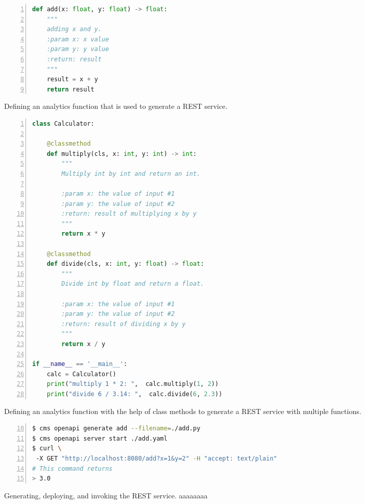 \newcommand{\FONT}{\tiny}


\begin{figure}[htb]
\begin{lstlisting}[language=Python,
                   basicstyle=\ttfamily\FONT,
                   numbers=left,                   
                   numbersep=5pt,
                   xleftmargin=5mm]
def add(x: float, y: float) -> float:
    """
    adding x and y.
    :param x: x value
    :param y: y value
    :return: result
    """
    result = x + y
    return result
\end{lstlisting}
\caption{Defining an analytics function that is used to generate a REST service.}
\label{fig:function}
\bigskip

\begin{lstlisting}[language=Python,
                   basicstyle=\ttfamily\FONT,
                   numbers=left,                   
                   numbersep=5pt,
                   xleftmargin=5mm]
class Calculator:

    @classmethod
    def multiply(cls, x: int, y: int) -> int:
        """
        Multiply int by int and return an int.

        :param x: the value of input #1
        :param y: the value of input #2
        :return: result of multiplying x by y
        """
        return x * y

    @classmethod
    def divide(cls, x: int, y: float) -> float:
        """
        Divide int by float and return a float.

        :param x: the value of input #1
        :param y: the value of input #2
        :return: result of dividing x by y
        """
        return x / y

if __name__ == '__main__':
    calc = Calculator()
    print("multiply 1 * 2: ",  calc.multiply(1, 2))
    print("divide 6 / 3.14: ",  calc.divide(6, 2.3))

\end{lstlisting}

\caption{Defining an analytics function with the help of class methods to generate a REST service with multiple functions.}
\label{fig:class}


\begin{lstlisting}[language=bash,
                   firstnumber=10,
                   basicstyle=\ttfamily\tiny,
                   numbers=left,                   
                   numbersep=5pt,
                   xleftmargin=5mm]
$ cms openapi generate add --filename=./add.py
$ cms openapi server start ./add.yaml 
$ curl \ 
 -X GET "http://localhost:8080/add?x=1&y=2" -H "accept: text/plain"
# This command returns
> 3.0
\end{lstlisting}
\caption{Generating, deploying, and invoking the REST service. {\color{white}aaaaaaaa}}
\label{fig:deploy-function}
\label{fig:function-curl}




\end{figure}
